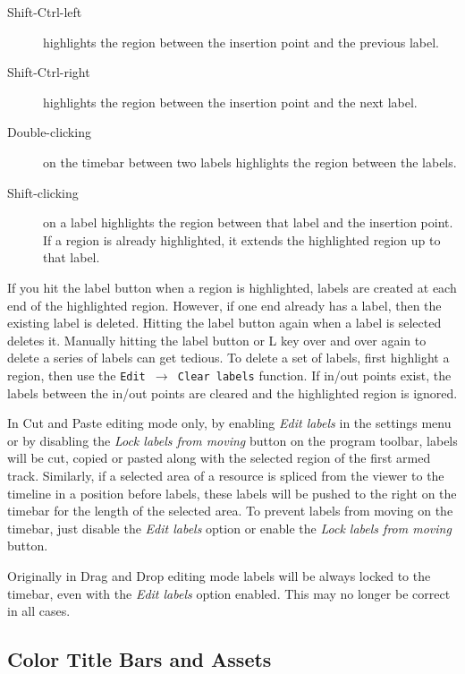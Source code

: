 \begin{description}
    \item[Shift-Ctrl-left] highlights the region between the insertion point and the previous label.
    \item[Shift-Ctrl-right] highlights the region between the insertion point and the next label.
    \item[Double-clicking] on the timebar between two labels highlights the region between the labels.	   
    \item[Shift-clicking] on a label highlights the region between that label and the insertion point.
        If a region is already highlighted, it extends the highlighted region up to that label.
\end{description}


If you hit the label button when a region is highlighted, labels are created at each end of the highlighted region. 
However, if one end already has a label, then the existing label is deleted. 
Hitting the label button again when a label is selected deletes it. 
Manually hitting the label button or L key over and over again to delete a series of labels can get tedious. 
To delete a set of labels, first highlight a region, then use the \texttt{Edit $\rightarrow$ Clear labels} function. 
If in/out points exist, the labels between the in/out points are cleared and the highlighted region is ignored.


In Cut and Paste editing mode only, by enabling \emph{Edit labels} in the settings menu or by disabling the \emph{Lock labels from moving} button on the program toolbar, labels will be cut, copied or pasted along with the selected region of the first armed track. 
Similarly, if a selected area of a resource is spliced from the viewer to the timeline in a position before labels, these labels will be pushed to the right on the timebar for the length of the selected area. 
To prevent labels from moving on the timebar, just disable the \emph{Edit labels} option or enable the \emph{Lock labels from moving} button.


Originally in Drag and Drop editing mode labels will be always locked to the timebar, even with the \emph{Edit labels} option enabled.  
This may no longer be correct in all cases. 

\subsection{Color Title Bars and Assets}%
\label{sub:color_title_bars_and_assets}

